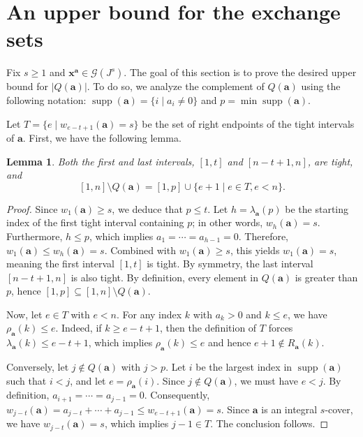 \documentclass[12pt]{amsart}
\newtheorem{lemma}[theorem]{Lemma}
\theoremstyle{definition}
\theoremstyle{remark}
\numberwithin{equation}{section}
\begin{document}
\section{An upper bound for the exchange sets}\label{sec:bound}

Fix $s \ge 1$ and $\mathbf{x}^{\mathbf{a}} \in \mathcal{G}(J^s)$. The goal of this section is to prove the desired upper bound for $|Q(\mathbf{a})|$. To do so, we analyze the complement of $Q(\mathbf{a})$ using the following notation: $\operatorname{supp}(\mathbf{a}) = \{i \mid a_i \neq 0\}$ and $p = \min \operatorname{supp}(\mathbf{a})$. 

Let $T = \{e \mid w_{e-t+1}(\mathbf{a}) = s\}$ be the set of right endpoints of the tight intervals of $\mathbf{a}$. First, we have the following lemma.

\begin{lemma}\label{lem:complements}
Both the first and last intervals, $[1, t]$ and $[n-t+1, n]$, are tight, and
\[
[1, n] \setminus Q(\mathbf{a}) = [1, p] \cup \{e + 1 \mid e \in T, e < n\}.
\]
\end{lemma}

\begin{proof}
Since $w_1(\mathbf{a}) \ge s$, we deduce that $p \le t$. Let $h = \lambda_{\mathbf{a}}(p)$ be the starting index of the first tight interval containing $p$; in other words, $w_h(\mathbf{a}) = s$. Furthermore, $h \le p$, which implies $a_1 = \cdots = a_{h-1} = 0$. Therefore, $w_1(\mathbf{a}) \le w_h(\mathbf{a}) = s$. Combined with $w_1(\mathbf{a}) \ge s$, this yields $w_1(\mathbf{a}) = s$, meaning the first interval $[1, t]$ is tight. By symmetry, the last interval $[n-t+1, n]$ is also tight. By definition, every element in $Q(\mathbf{a})$ is greater than $p$, hence $[1, p] \subseteq [1, n] \setminus Q(\mathbf{a})$.

Now, let $e \in T$ with $e < n$. For any index $k$ with $a_k > 0$ and $k \le e$, we have $\rho_{\mathbf{a}}(k) \le e$. Indeed, if $k \ge e-t+1$, then the definition of $T$ forces $\lambda_{\mathbf{a}}(k) \le e-t+1$, which implies $\rho_{\mathbf{a}}(k) \le e$ and hence $e + 1 \notin R_{\mathbf{a}}(k)$.

Conversely, let $j \notin Q(\mathbf{a})$ with $j > p$. Let $i$ be the largest index in $\operatorname{supp}(\mathbf{a})$ such that $i < j$, and let $e = \rho_{\mathbf{a}}(i)$. Since $j \notin Q(\mathbf{a})$, we must have $e < j$. By definition, $a_{i+1} = \cdots = a_{j-1} = 0$. Consequently, $w_{j-t}(\mathbf{a}) = a_{j-t} + \cdots + a_{j-1} \le w_{e-t+1}(\mathbf{a}) = s$. Since $\mathbf{a}$ is an integral $s$-cover, we have $w_{j-t}(\mathbf{a}) = s$, which implies $j - 1 \in T$. The conclusion follows.
\end{proof}
\end{document}
